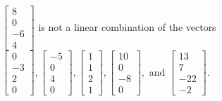 \begin{exercise}
\begin{exerciseStatement}
  \end{exerciseStatement}
  \begin{exerciseAnswer}
   \(\left[\begin{array}{c}
8 \\
0 \\
-6 \\
4
\end{array}\right]\) 
  	 is not  
	a linear combination of the vectors \(\left[\begin{array}{c}
0 \\
-3 \\
2 \\
0
\end{array}\right] , \left[\begin{array}{c}
-5 \\
0 \\
4 \\
0
\end{array}\right] , \left[\begin{array}{c}
1 \\
1 \\
2 \\
1
\end{array}\right] , \left[\begin{array}{c}
10 \\
0 \\
-8 \\
0
\end{array}\right] , \text{ and } \left[\begin{array}{c}
13 \\
7 \\
-22 \\
-2
\end{array}\right]\).

	
  


  \end{exerciseAnswer}
\end{exercise}